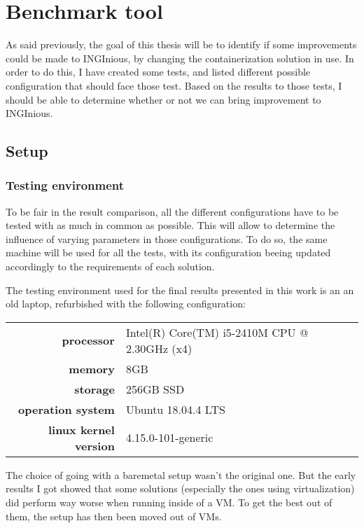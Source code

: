 \chapter{Benchmark tool}

As said previously, the goal of this thesis will be to identify if some improvements could be made to INGInious, by changing the containerization solution in use.  In order to do this, I have created some tests, and listed different possible configuration that should face those test.  Based on the results to those tests, I should be able to determine whether or not we can bring improvement to INGInious.

\section{Setup}
\subsection{Testing environment}
To be fair in the result comparison, all the different configurations have to be tested with as much in common as possible.  This will allow to determine the influence of varying parameters in those configurations.  To do so, the same machine will be used for all the tests, with its configuration beeing updated accordingly to the requirements of each solution.

The testing environment used for the final results presented in this work is an an old laptop, refurbished with the following configuration:\\
\begin{tabular}{rl}

  \textbf{processor} & Intel(R) Core(TM) i5-2410M CPU @ 2.30GHz (x4) \\
  \textbf{memory} & 8GB \\
  \textbf{storage} & 256GB SSD \\
  \textbf{operation system} & Ubuntu 18.04.4 LTS \\
  \textbf{linux kernel version} & 4.15.0-101-generic \\

\end{tabular}


The choice of going with a baremetal setup wasn't the original one.  But the early results I got showed that some solutions (especially the ones using virtualization) did perform way worse when running inside of a VM.  To get the best out of them, the setup has then been moved out of VMs.

